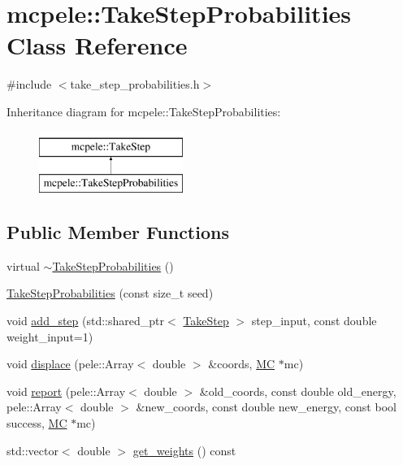 \hypertarget{classmcpele_1_1TakeStepProbabilities}{\section{mcpele\-:\-:\-Take\-Step\-Probabilities \-Class \-Reference}
\label{classmcpele_1_1TakeStepProbabilities}
}


{\ttfamily \#include $<$take\-\_\-step\-\_\-probabilities.\-h$>$}

\-Inheritance diagram for mcpele\-:\-:\-Take\-Step\-Probabilities\-:\begin{figure}[H]
\begin{center}
\leavevmode
\includegraphics[height=2.000000cm]{classmcpele_1_1TakeStepProbabilities}
\end{center}
\end{figure}
\subsection*{\-Public \-Member \-Functions}
\begin{DoxyCompactItemize}
\item 
virtual \hyperlink{classmcpele_1_1TakeStepProbabilities_a6f7d0c9b37fbfb47fc4bd387472b1dac}{$\sim$\-Take\-Step\-Probabilities} ()
\item 
\hyperlink{classmcpele_1_1TakeStepProbabilities_a8079f6916d0d1052cbe41bf53610c9aa}{\-Take\-Step\-Probabilities} (const size\-\_\-t seed)
\item 
void \hyperlink{classmcpele_1_1TakeStepProbabilities_a754adeca2adcad04c43043f937fc915f}{add\-\_\-step} (std\-::shared\-\_\-ptr$<$ \hyperlink{classmcpele_1_1TakeStep}{\-Take\-Step} $>$ step\-\_\-input, const double weight\-\_\-input=1)
\item 
void \hyperlink{classmcpele_1_1TakeStepProbabilities_ae6f6a8c420950d97d463ee4cff74ad0f}{displace} (pele\-::\-Array$<$ double $>$ \&coords, \hyperlink{classmcpele_1_1MC}{\-M\-C} $\ast$mc)
\item 
void \hyperlink{classmcpele_1_1TakeStepProbabilities_a595978a5e30ba966e1f328826a8f1e68}{report} (pele\-::\-Array$<$ double $>$ \&old\-\_\-coords, const double old\-\_\-energy, pele\-::\-Array$<$ double $>$ \&new\-\_\-coords, const double new\-\_\-energy, const bool success, \hyperlink{classmcpele_1_1MC}{\-M\-C} $\ast$mc)
\item 
std\-::vector$<$ double $>$ \hyperlink{classmcpele_1_1TakeStepProbabilities_aa7e74438ac856884198539d1091b2f35}{get\-\_\-weights} () const 
\end{DoxyCompactItemize}


